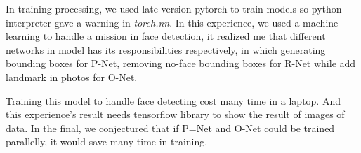 \documentclass[journal, a4paper]{IEEEtran}
\begin{document}
 In training processing, we used late version pytorch to train models so python interpreter gave a warning in \textit{torch.nn}. In this experience, we used a machine learning to handle a mission in face detection, it realized me that different networks in model has its responsibilities respectively, in which generating bounding boxes for P-Net, removing no-face bounding boxes for R-Net while add landmark in photos for O-Net.
	
	Training this model to handle face detecting cost many time in a laptop. And this experience's result needs tensorflow library to show the result of images of data. In the final, we conjectured that if P=Net and O-Net could be trained parallelly, it would save many time in training.

\printbibliography

\end{document}
